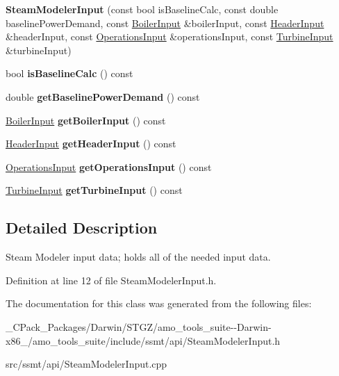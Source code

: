 \begin{DoxyCompactItemize}
{\bfseries Steam\+Modeler\+Input} (const bool is\+Baseline\+Calc, const double baseline\+Power\+Demand, const \hyperlink{class_boiler_input}{Boiler\+Input} \&boiler\+Input, const \hyperlink{class_header_input}{Header\+Input} \&header\+Input, const \hyperlink{class_operations_input}{Operations\+Input} \&operations\+Input, const \hyperlink{class_turbine_input}{Turbine\+Input} \&turbine\+Input)
\item 
\mbox{\label{class_steam_modeler_input_ac4122e6a8b606181260f2cd5e2951345}} 
bool {\bfseries is\+Baseline\+Calc} () const
\item 
\mbox{\label{class_steam_modeler_input_a42f256f493a27def4822f39dce05dd16}} 
double {\bfseries get\+Baseline\+Power\+Demand} () const
\item 
\mbox{\label{class_steam_modeler_input_a6582aa30956b3b633658bbfb6d95487f}} 
\hyperlink{class_boiler_input}{Boiler\+Input} {\bfseries get\+Boiler\+Input} () const
\item 
\mbox{\label{class_steam_modeler_input_af0850a10ee75b1f5515a4ad4439167d3}} 
\hyperlink{class_header_input}{Header\+Input} {\bfseries get\+Header\+Input} () const
\item 
\mbox{\label{class_steam_modeler_input_a913796b30c4b12838a5ddd375933e0c0}} 
\hyperlink{class_operations_input}{Operations\+Input} {\bfseries get\+Operations\+Input} () const
\item 
\mbox{\label{class_steam_modeler_input_a75b92d1012b73e09fa4c19649661c53f}} 
\hyperlink{class_turbine_input}{Turbine\+Input} {\bfseries get\+Turbine\+Input} () const
\end{DoxyCompactItemize}


\subsection{Detailed Description}
Steam Modeler input data; holds all of the needed input data. 

Definition at line 12 of file Steam\+Modeler\+Input.\+h.



The documentation for this class was generated from the following files\+:\begin{DoxyCompactItemize}
\item 
\+\_\+\+C\+Pack\+\_\+\+Packages/\+Darwin/\+S\+T\+G\+Z/amo\+\_\+tools\+\_\+suite-\/-\/\+Darwin-\/x86\+\_/amo\+\_\+tools\+\_\+suite/include/ssmt/api/Steam\+Modeler\+Input.\+h\item 
src/ssmt/api/Steam\+Modeler\+Input.\+cpp\end{DoxyCompactItemize}
